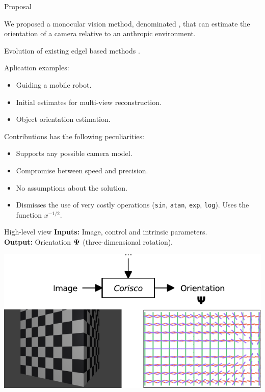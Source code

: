 \begin{frame}{Proposal}
  \begin{overprint}
    \alert<+>{} We proposed a \alert<+>{monocular} vision method,
    denominated \corisco, that can estimate the orientation of a camera relative to an anthropic environment.\alert<+>{}

    Evolution of existing edgel based methods \citep{Coughlan2003}.

    Aplication examples:\\
    \begin{itemize}
    \item Guiding a mobile robot.
    \item Initial estimates for multi-view reconstruction.
    \item Object orientation estimation.
    \end{itemize}
  \end{overprint}
\end{frame}


\begin{frame}{Contributions}
  \corisco has the following peculiarities:\\
  \begin{itemize}
  \item Supports any possible camera model.
  \item Compromise between speed and precision.
  \item No assumptions about the solution.
  \item Dismisses the use of very costly operations ({\tt sin}, {\tt atan},
    {\tt exp}, {\tt log}). Uses the function $x^{-1/2}$.
  \end{itemize}
\end{frame}


\begin{frame}{High-level view}{}
  {\bf Inputs:} Image, control and intrinsic parameters.\\
  {\bf Output:} Orientation ${\boldsymbol{\Psi}}$ (three-dimensional rotation).
  \vfill
  \centerline{\includegraphics[height=11\baselineskip]{cg.pdf}}    
  \end{frame}


